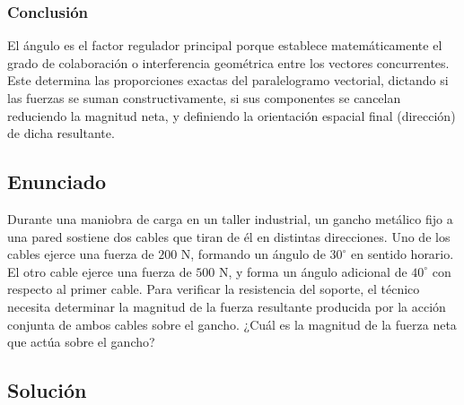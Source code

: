 \documentclass[12pt, a4paper]{article}
\begin{document}
\subsubsection*{Conclusión}
El ángulo es el factor regulador principal porque establece matemáticamente el grado de colaboración o interferencia geométrica entre los vectores concurrentes. Este determina las proporciones exactas del paralelogramo vectorial, dictando si las fuerzas se suman constructivamente, si sus componentes se cancelan reduciendo la magnitud neta, y definiendo la orientación espacial final (dirección) de dicha resultante.

\newpage

\subsection*{Enunciado}
Durante una maniobra de carga en un taller industrial, un gancho metálico fijo a una pared sostiene dos cables que tiran de él en distintas direcciones. Uno de los cables ejerce una fuerza de $200 \text{ N}$, formando un ángulo de $30^\circ$ en sentido horario. El otro cable ejerce una fuerza de $500 \text{ N}$, y forma un ángulo adicional de $40^\circ$ con respecto al primer cable. Para verificar la resistencia del soporte, el técnico necesita determinar la magnitud de la fuerza resultante producida por la acción conjunta de ambos cables sobre el gancho. ¿Cuál es la magnitud de la fuerza neta que actúa sobre el gancho?

\begin{center}
\end{center}

\subsection*{Solución}
\end{document}
